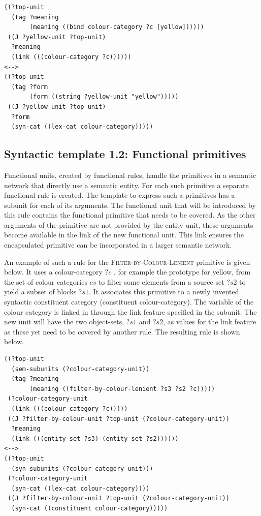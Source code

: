 \footnotesize
{}
\begin{lstlisting}
((?top-unit
  (tag ?meaning 
       (meaning ((bind colour-category ?c [yellow])))))
 ((J ?yellow-unit ?top-unit)
  ?meaning
  (link (((colour-category ?c))))))
<-->
((?top-unit
  (tag ?form 
       (form ((string ?yellow-unit "yellow")))))
 ((J ?yellow-unit ?top-unit)
  ?form
  (syn-cat ((lex-cat colour-category)))))
\end{lstlisting}
\normalsize

\subsection{Syntactic template 1.2: Functional primitives}

Functional units, created by functional rules, handle
the primitives in a semantic network that directly use a semantic
entity. For each such primitive a separate functional rule is
created. The template to express such a primitives has a subunit for
each of its arguments. The functional unit that will be introduced by
this rule contains the functional primitive that needs to be covered.
As the other arguments of the primitive are not provided by the entity
unit, these arguments become available in the link of the new
functional unit. This link ensures the encapsulated primitive can be
incorporated in a larger semantic network.

An example of such a rule for the \textsc{Filter-by-Colour-Lenient}
primitive is given below. It uses a colour-category $?c$ , for example
the prototype for yellow, from the set of colour categories $cs$ to
filter some elements from a source set $?s2$ to yield a subset of
blocks $?s1$. It associates this primitive to a newly invented
syntactic constituent category (constituent colour-category).  The
variable of the colour category is linked in through the link feature 
specified in the subunit. The new unit will have the two object-sets,
$?s1$ and $?s2$, as values for the link feature 
as these yet need to be covered by
another rule. The resulting rule is shown below.

\footnotesize
{}
\begin{lstlisting}
((?top-unit
  (sem-subunits (?colour-category-unit)) 
  (tag ?meaning
       (meaning ((filter-by-colour-lenient ?s3 ?s2 ?c)))))
 (?colour-category-unit 
  (link (((colour-category ?c)))))
 ((J ?filter-by-colour-unit ?top-unit (?colour-category-unit))
  ?meaning
  (link (((entity-set ?s3) (entity-set ?s2))))))
<-->
((?top-unit 
  (syn-subunits (?colour-category-unit)))
 (?colour-category-unit 
  (syn-cat ((lex-cat colour-category))))
 ((J ?filter-by-colour-unit ?top-unit (?colour-category-unit))
  (syn-cat ((constituent colour-category)))))
\end{lstlisting}
\normalsize

